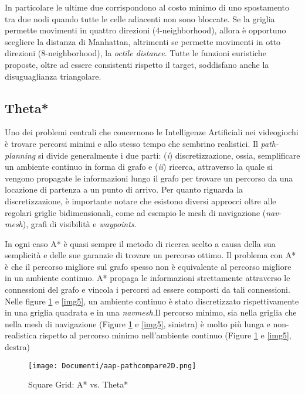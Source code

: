 \documentclass[11pt]{article}
\begin{document}
\par{In particolare le ultime due corrispondono al costo minimo di uno spostamento tra due nodi quando tutte le celle adiacenti non sono bloccate. Se la griglia permette movimenti in quattro direzioni (4-neighborhood), allora \`e opportuno scegliere la distanza di Manhattan, altrimenti se permette movimenti in otto direzioni (8-neighborhood), la \emph{octile distance}. Tutte le funzioni euristiche proposte, oltre ad essere consistenti rispetto il target, soddisfano anche la disuguaglianza triangolare.}
\subsection{Theta*}



\par{Uno dei problemi centrali che concernono le Intelligenze Artificiali nei videogiochi \`e trovare percorsi minimi e allo stesso tempo che sembrino realistici. Il \emph{path-planning} si divide generalmente i due parti: (\emph{i}) discretizzazione, ossia, semplificare un ambiente continuo in forma di grafo e (\emph{ii}) ricerca, attraverso la quale si vengono propagate le informazioni lungo il grafo per trovare un percorso da una locazione di partenza a un punto di arrivo. Per quanto riguarda la discretizzazione, \`e importante notare che esistono diversi approcci oltre alle regolari griglie bidimensionali, come ad esempio le mesh di navigazione (\emph{nav-mesh}), grafi di visibilit\`a e  \emph{waypoints}.}

\par{In ogni caso A* \`e quasi sempre il metodo di ricerca scelto a causa della sua semplicit\`a e delle sue garanzie di trovare un percorso ottimo. Il problema con A* \`e che il percorso migliore sul grafo spesso non \`e equivalente al percorso migliore in un ambiente continuo. A* propaga le informazioni strettamente attraverso le connessioni del grafo e vincola i percorsi ad essere composti da tali connessioni. Nelle figure \ref{img4} e \ref{img5}, un ambiente continuo \`e stato discretizzato rispettivamente in una griglia quadrata e in una \emph{navmesh}.Il percorso minimo, sia nella griglia che nella mesh di navigazione (Figure \ref{img4} e \ref{img5}, sinistra) \`e molto pi\`u lunga e non-realistica rispetto al percorso minimo nell'ambiente continuo (Figure \ref{img4} e \ref{img5}, destra)}
\begin{figure}[htp]
\centering
\texttt{[image: Documenti/aap-pathcompare2D.png]}
\caption{Square Grid: A* vs. Theta* }
\label{img4}
\end{figure}
\end{document}
